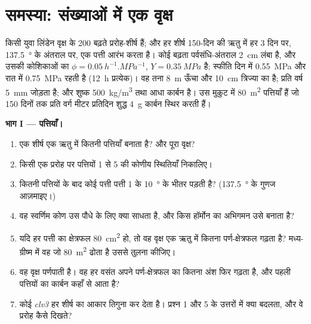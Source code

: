 \section{समस्या: संख्याओं में एक वृक्ष}

\begin{problem}
\label{pb:b2:plant-meristems:1}
किसी युवा लिंडेन वृक्ष के \num{200} बढ़ते प्ररोह-शीर्ष हैं; और हर शीर्ष
\num{150}-दिन की ऋतु में हर \num{3} दिन पर, \qty{137.5}{\degree} के
अंतराल पर, एक पत्ती आरंभ करता है। कोई बढ़ता पर्वसंधि-अंतराल \qty{2}{cm}
लंबा है, और उसकी कोशिकाओं का $\phi = \qty{0.05}{h^{-1}.MPa^{-1}}$, $Y =
\qty{0.35}{MPa}$ है; स्फीति दिन में \qty{0.55}{MPa} और
रात में \qty{0.75}{MPa} रहती है (\qty{12}{h} प्रत्येक)। वह तना
\qty{8}{m} ऊँचा और \qty{10}{cm} त्रिज्या का है;  प्रति वर्ष
\qty{5}{mm} जोड़ता है; और शुष्क  \qty{500}{kg/m^3} तथा आधा कार्बन है।
उस मुकुट में \qty{80}{m^2} पत्तियाँ हैं जो \num{150} दिनों तक प्रति वर्ग
मीटर प्रतिदिन शुद्ध \qty{4}{g} कार्बन स्थिर करती हैं।

\medskip
\noindent\textbf{भाग I --- पत्तियाँ।}
\begin{enumerate}
  \item एक शीर्ष एक ऋतु में कितनी पत्तियाँ बनाता है? और पूरा
        वृक्ष?
  \item किसी एक प्ररोह पर पत्तियों 1 से 5 की कोणीय स्थितियाँ निकालिए।
  \item कितनी पत्तियों के बाद कोई पत्ती पत्ती 1 के
        \qty{10}{\degree} के भीतर पड़ती है? (\qty{137.5}{\degree} के
        गुणज आज़माइए।)
  \item वह स्वर्णिम कोण उस पौधे के लिए क्या साधता है, और किस हॉर्मोन
        का अभिगमन उसे बनाता है?
  \item यदि हर पत्ती का क्षेत्रफल \qty{80}{cm^2} हो, तो वह वृक्ष एक
        ऋतु में कितना पर्ण-क्षेत्रफल गढ़ता है? मध्य-ग्रीष्म में वह जो
        \qty{80}{m^2} ढोता है उससे तुलना कीजिए।
  \item वह वृक्ष पर्णपाती है। वह हर वसंत अपने पर्ण-क्षेत्रफल का कितना
        अंश फिर गढ़ता है, और पहली पत्तियों का कार्बन कहाँ से आता है?
  \item कोई \emph{clv3}  हर शीर्ष का आकार तिगुना कर देता है।
        प्रश्न 1 और 5 के उत्तरों में क्या बदलता, और वे प्ररोह कैसे
        दिखते?
\end{enumerate}


\end{problem}
